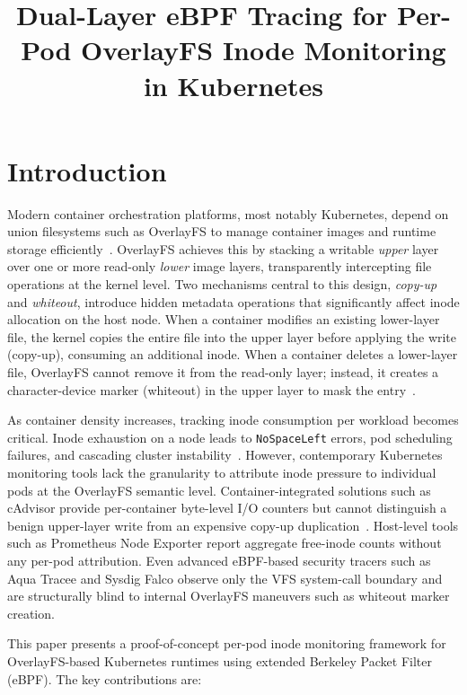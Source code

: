 \documentclass[conference]{IEEEtran}
\title{Dual-Layer eBPF Tracing for Per-Pod OverlayFS Inode Monitoring in Kubernetes}
\begin{document}
\maketitle

\section{Introduction}
\label{sec:introduction}

Modern container orchestration platforms, most notably Kubernetes, depend on union filesystems such as OverlayFS to manage container images and runtime storage efficiently~\cite{watada2019emerging, tarasov2017ideal}. OverlayFS achieves this by stacking a writable \emph{upper} layer over one or more read-only \emph{lower} image layers, transparently intercepting file operations at the kernel level. Two mechanisms central to this design, \emph{copy-up} and \emph{whiteout}, introduce hidden metadata operations that significantly affect inode allocation on the host node. When a container modifies an existing lower-layer file, the kernel copies the entire file into the upper layer before applying the write (copy-up), consuming an additional inode. When a container deletes a lower-layer file, OverlayFS cannot remove it from the read-only layer; instead, it creates a character-device marker (whiteout) in the upper layer to mask the entry~\cite{sun2020baoverlay}.

As container density increases, tracking inode consumption per workload becomes critical. Inode exhaustion on a node leads to \texttt{NoSpaceLeft} errors, pod scheduling failures, and cascading cluster instability~\cite{awad2023survey}. However, contemporary Kubernetes monitoring tools lack the granularity to attribute inode pressure to individual pods at the OverlayFS semantic level. Container-integrated solutions such as cAdvisor provide per-container byte-level I/O counters but cannot distinguish a benign upper-layer write from an expensive copy-up duplication~\cite{inagaki2016container}. Host-level tools such as Prometheus Node Exporter report aggregate free-inode counts without any per-pod attribution. Even advanced eBPF-based security tracers such as Aqua Tracee and Sysdig Falco observe only the VFS system-call boundary and are structurally blind to internal OverlayFS maneuvers such as whiteout marker creation.

This paper presents a proof-of-concept per-pod inode monitoring framework for OverlayFS-based Kubernetes runtimes using extended Berkeley Packet Filter (eBPF). The key contributions are:
\end{document}
